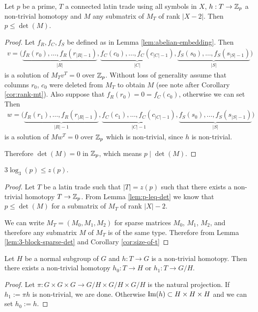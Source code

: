 \begin{lem}
\label{lem:p-leq-det}
Let $p$ be a prime, $T$ a connected latin trade using all symbols in $X$, $h: T \rightarrow \mathbb Z_p$ a non-trivial homotopy and $M$ any submatrix of $M_T$ of rank $|X-2|$. Then $p \leq \det(M)$.
\end{lem}
\begin{proof}
Let $f_R,f_C,f_S$ be defined as in Lemma \ref{lem:abelian-embedding}. Then
\begin{align*}
	v = \big(\underbrace{f_R(r_0), \dots, f_R(r_{|R|-1})}_{|R|},\underbrace{f_C(c_0), \dots, f_C(c_{|C|-1})}_{|C|}, \underbrace{f_S(s_0), \dots, f_S(s_{|S|-1})}_{|S|}\big)
\end{align*}
is a solution of $M_Tv^T = 0$ over $\mathbb Z_p$. Without loss of generality assume that columns $r_0$, $c_0$ were deleted from $M_T$ to obtain $M$ (see note after Corollary \ref{cor:rank-mt}). Also suppose that $f_R(r_0) = 0 = f_C(c_0)$, otherwise we can set
%
Then
\begin{align*}
	w = \big(\underbrace{f_R(r_1), \dots, f_R(r_{|R|-1})}_{|R|-1},\underbrace{f_C(c_1), \dots, f_C(c_{|C|-1})}_{|C|-1}, \underbrace{f_S(s_0), \dots, f_S(s_{|S|-1})}_{|S|}\big)
\end{align*}
is a solution of $Mw^T = 0$ over $\mathbb Z_p$ which is non-trivial, since $h$ is non-trivial.

Therefore $\det(M) = 0$ in $\mathbb Z_p$, which means $p \mid \det(M)$.
\end{proof}

\begin{lem}
\label{lem:lower-bound-zp}
$3 \log_3(p) \leq z(p)$.
\end{lem}%
\begin{proof}
Let $T$ be a latin trade such that $|T| = z(p)$ such that there exists a non-trivial homotopy $T \rightarrow \mathbb Z_p$. From Lemma \ref{lem:p-leq-det} we know that $p \leq \det(M)$ for a submatrix of $M_T$ of rank $|X|-2$.

We can write $M_T = (M_0, M_1, M_2)$ for sparse matrices $M_0$, $M_1$, $M_2$, and therefore any submatrix $M$ of $M_T$ is of the same type. Therefore from Lemma \ref{lem:3-block-sparse-det} and Corollary \ref{cor:size-of-t}
%
\end{proof}

\begin{lem}
Let $H$ be a normal subgroup of $G$ and $h: T \rightarrow G$ is a non-trivial homotopy. Then there exists a non-trivial homotopy $h_0: T \rightarrow H$ or $h_1: T \rightarrow G/H$.
\end{lem}
\begin{proof}
Let $\pi: G \times G \times G \rightarrow G/H \times G/H \times G/H$ is the natural projection. If $h_1 := \pi h$ is non-trivial, we are done. Otherwise $\mathop{\mathrm{Im}}(h) \subset H \times H \times H$ and we can set $h_0 := h$.
\end{proof}

